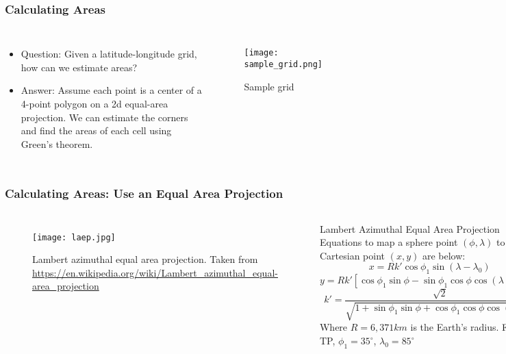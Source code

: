 \begin{frame}
\frametitle{Calculating Areas}
\begin{columns}
\begin{itemize}
    \item Question: Given a latitude-longitude grid, how can we estimate areas?
    \item Answer: Assume each point is a center of a 4-point polygon on a 2d equal-area projection. We can estimate the corners and find the areas of each cell using Green's theorem.
\end{itemize}

\begin{figure}[ht]
\vspace*{-.5cm}
\centering
\begin{minipage}{1\linewidth}
\texttt{[image: sample\_grid.png]}
\caption{\tiny{Sample grid}}
\end{minipage}
\end{figure}
\end{columns}
\end{frame}

\begin{frame}
\frametitle{Calculating Areas: Use an Equal Area Projection}
\begin{columns}
\begin{figure}
\vspace*{-.6cm}
\begin{minipage}{1\columnwidth}
\centering
\texttt{[image: laep.jpg]}
\caption{\tiny{Lambert azimuthal equal area projection. Taken from \url{https://en.wikipedia.org/wiki/Lambert_azimuthal_equal-area_projection}}}
\end{minipage}
\end{figure}
\begin{block}{Lambert Azimuthal Equal Area Projection}
Equations to map a sphere point $(\phi, \lambda)$ to a Cartesian point $(x,y)$  are below:
\begin{equation*}
x = R k' \cos\phi_{1}\sin(\lambda - \lambda_0)
\end{equation*}
\begin{equation*}
y = R k'[\cos\phi_{1}\sin\phi - \sin\phi_{1}\cos\phi \cos(\lambda - \lambda_{0})]
\end{equation*}
\begin{equation*}
k' = \frac{\sqrt{2}}{\sqrt{1+\sin\phi_{1}\sin\phi + \cos\phi_{1}\cos\phi \cos(\lambda\lambda_{0})}}
\end{equation*}
Where $R=6,371 km$ is the Earth's radius. For the TP, $\phi_{1} = 35^{\circ}$, $\lambda_{0}=85^{\circ}$ 
\end{block}
\end{columns}
\end{frame}


